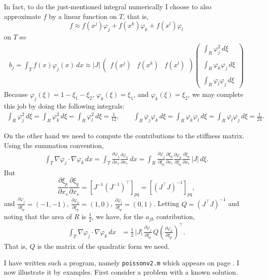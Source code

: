 \documentclass[12pt]{amsart}
\theoremstyle{definition}
\newcommand{\mtt}{\texttt}
\newcommand{\grad}{\nabla}
\newcommand{\vf}{\varphi}
\begin{document}
In fact, to do the just-mentioned integral numerically I choose to also approximate $f$ by a linear function on $T$, that is,
    $$f \approx f(x^j) \vf_j + f(x^k) \vf_k + f(x^l) \vf_l$$
on $T$ so
\begin{align*}
b_j=\int_T f(x) \vf_j(x)\,dx \approx |J|\,\begin{pmatrix} f(x^j) & f(x^k) & f(x^l) \end{pmatrix} \begin{pmatrix} \int_R \vf_j^2\,d\xi \\ \\ \int_R \vf_k\vf_j\,d\xi \\ \\ \int_R \vf_l\vf_j\,d\xi \end{pmatrix}
\end{align*}
Because $\vf_j(\xi)=1-\xi_1-\xi_2$, $\vf_k(\xi)=\xi_1$, and $\vf_k(\xi)=\xi_2$, we may complete this job by doing the following integrals:
\small\begin{gather*}
\int_R \vf_j^2\,d\xi = \int_R \vf_k^2\,d\xi = \int_R \vf_l^2\,d\xi = \frac{1}{12}, \qquad \int_R \vf_j\vf_k\,d\xi = \int_R \vf_k\vf_l\,d\xi = \int_R \vf_l\vf_j\,d\xi = \frac{1}{24}.
\end{gather*}\normalsize

On the other hand we need to compute the contributions to the stiffness matrix.  Using the summation convention,
\newcommand{\ppxs}[1]{\frac{\partial #1}{\partial x_s}}
\newcommand{\ppxip}[1]{\frac{\partial #1}{\partial \xi_p}}
\newcommand{\ppxiq}[1]{\frac{\partial #1}{\partial \xi_q}}
\begin{align*}
\int_T \grad\vf_j\cdot \grad\vf_k\,dx = \int_T \ppxs{\vf_j}\ppxs{\vf_k}\,dx = \int_R \ppxip{\vf_j} \ppxs{\xi_p} \ppxiq{\vf_k} \ppxs{\xi_q} \,|J|\,d\xi.
\end{align*}
But
    $$\ppxs{\xi_p} \ppxs{\xi_q} = \left[J^{-1} (J^{-1})^\top\right]_{pq} = \left[ (J^\top J)^{-1}\right]_{pq},$$
and $\ppxip{\vf_j}=(-1,-1)$, $\ppxip{\vf_k}=(1,0)$, $\ppxip{\vf_l}=(0,1)$.  Letting $Q=(J^\top J)^{-1}$ and noting that the area of $R$ is $\frac{1}{2}$, we have, for the $a_{jk}$ contribution,
\begin{align*}
\int_T \grad\vf_j \cdot \grad\vf_k\,dx &= \frac{1}{2}\, |J| \,\ppxip{\vf_j}\, Q \left(\ppxip{\vf_k}\right)^\top.
\end{align*}
That is, $Q$ is the matrix of the quadratic form we need.
  
I have written such a program, namely \mtt{poissonv2.m} which appears on page \pageref{codepage}.  I now illustrate it by examples.  First consider a problem with a known solution.\medskip
\end{document}
